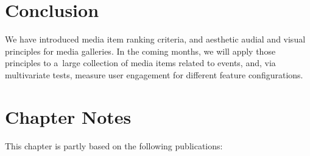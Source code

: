 \section{Conclusion}
We have introduced media item ranking criteria, and
aesthetic audial and visual principles for media galleries.
In the coming months, we will apply those principles
to a~large collection of media items related to events,
and, via multivariate tests, measure user engagement
for different feature configurations.

\section*{Chapter Notes}
This chapter is partly based on the following publications:
